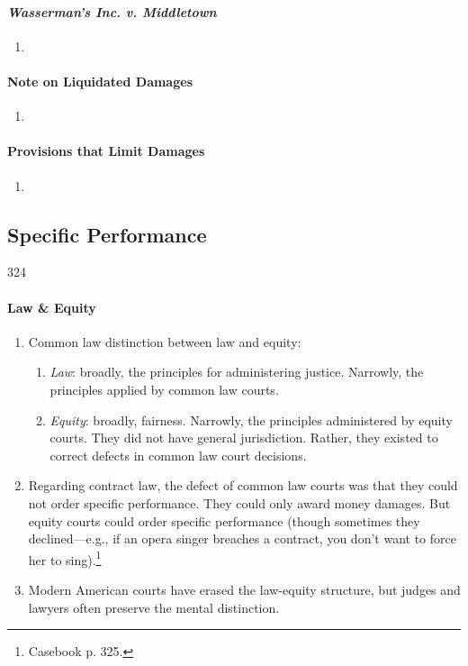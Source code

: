 \paragraph{\emph{Wasserman's Inc. v. Middletown}}

\begin{enumerate}
    \item %
\end{enumerate}

\paragraph{Note on Liquidated Damages}

\begin{enumerate}
    \item %
\end{enumerate}

\paragraph{Provisions that Limit Damages}

\begin{enumerate}
    \item %
\end{enumerate}

\subsection{Specific Performance} 324

\paragraph{Law \& Equity}

\begin{enumerate}
    \item Common law distinction between law and equity:
    \begin{enumerate}
        \item \emph{Law}: broadly, the principles for administering justice. 
        Narrowly, the principles applied by common law courts.
        \item \emph{Equity}: broadly, fairness. Narrowly, the principles 
        administered by equity courts. They did not have general jurisdiction. 
        Rather, they existed to correct defects in common law court decisions.
    \end{enumerate}
    \item Regarding contract law, the defect of common law courts was that  
    they could not order specific performance. They could only award money 
    damages. But equity courts could order specific performance (though 
    sometimes they declined---e.g., if an opera singer breaches a contract, 
    you don't want to force her to sing).\footnote{Casebook p. 325.}
    \item Modern American courts have erased the law-equity structure, but 
    judges and lawyers often preserve the mental distinction.
\end{enumerate}

